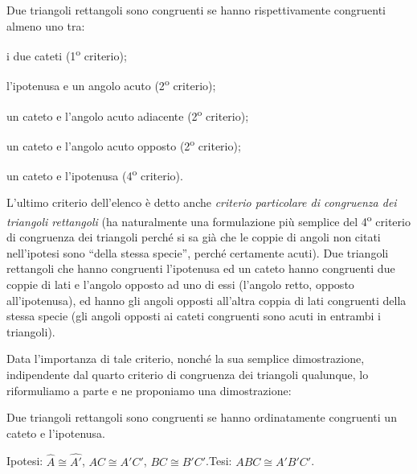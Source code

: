 \begin{teorema}
Due triangoli rettangoli sono congruenti se hanno rispettivamente congruenti almeno uno tra:
\begin{itemize*}
\item i due cateti (1\textsuperscript{o} criterio);
\item l'ipotenusa e un angolo acuto (2\textsuperscript{o} criterio);
\item un cateto e l'angolo acuto adiacente (2\textsuperscript{o} criterio);
\item un cateto e l'angolo acuto opposto (2\textsuperscript{o} criterio);
\item un cateto e l'ipotenusa (4\textsuperscript{o} criterio).
\end{itemize*}
\end{teorema}

L'ultimo criterio dell'elenco è detto anche \emph{criterio particolare di congruenza dei triangoli rettangoli} (ha naturalmente una formulazione più semplice del 4\textsuperscript{o} criterio di congruenza dei triangoli perché si sa già che le coppie di angoli non citati nell'ipotesi sono ``della stessa specie'', perché certamente acuti). Due triangoli rettangoli che hanno congruenti l'ipotenusa ed un cateto hanno congruenti due coppie di lati e l'angolo opposto ad uno di essi (l'angolo retto, opposto all'ipotenusa), ed hanno gli angoli opposti all'altra coppia di lati congruenti della stessa specie (gli angoli opposti ai cateti congruenti sono acuti in entrambi i triangoli). 

Data l'importanza di tale criterio, nonché la sua semplice dimostrazione, indipendente dal quarto criterio di congruenza dei triangoli qualunque, lo riformuliamo a parte e ne proponiamo una dimostrazione:
\begin{teorema}
Due triangoli rettangoli sono congruenti se hanno ordinatamente congruenti un cateto e l'ipotenusa.
\end{teorema}

\noindent Ipotesi: $\widehat{A}\cong \widehat{A'}$, $AC\cong A'C'$, $BC\cong B'C'$.\tab Tesi: $ABC\cong A'B'C'$.

